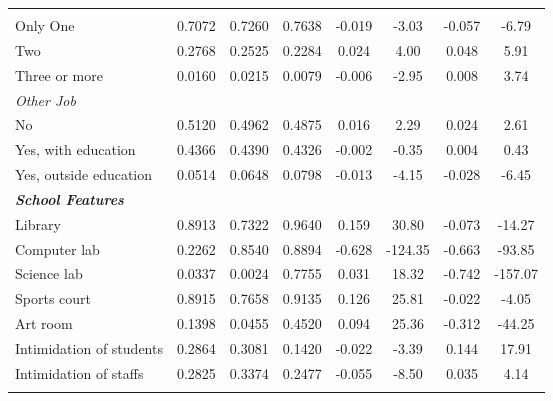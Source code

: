 \documentclass[a4paper, 12pt]{article}
\newcommand{\sym}[1]{\rlap{#1}}%
\begin{document}
\begin{longtable}{@{\extracolsep{1pt}}l*{7}{c}@{}}
\begin{adjustbox}{scale=0.9}
\begin{tabular}{l*{1}{ccccccc}}
\emph{Schools that work}&            &            &            &                     &            &                     &            \\
Only One    &      0.7072&      0.7260&      0.7638&      -0.019\sym{***}&       -3.03&      -0.057\sym{***}&       -6.79\\
Two         &      0.2768&      0.2525&      0.2284&       0.024\sym{***}&        4.00&       0.048\sym{***}&        5.91\\
Three or more&      0.0160&      0.0215&      0.0079&       -0.006\sym{***}&       -2.95&       0.008\sym{***}&        3.74\\
\emph{Other Job}&            &            &            &                     &            &                     &            \\
No          &      0.5120&      0.4962&      0.4875&       0.016\sym{**} &        2.29&       0.024\sym{***}&        2.61\\
Yes, with education&      0.4366&      0.4390&      0.4326&       -0.002         &       -0.35&       0.004         &        0.43\\
Yes, outside education&      0.0514&      0.0648&      0.0798&      -0.013\sym{***}&       -4.15&      -0.028\sym{***}&       -6.45\\
\textbf{\emph{School Features}}&            &            &            &                     &            &                     &            \\
Library     &      0.8913&      0.7322&      0.9640&      0.159\sym{***}&       30.80&      -0.073\sym{***}&      -14.27\\
Computer lab&      0.2262&      0.8540&      0.8894&      -0.628\sym{***}&     -124.35&      -0.663\sym{***}&      -93.85\\
Science lab &      0.0337&      0.0024&      0.7755&      0.031\sym{***}&       18.32&      -0.742\sym{***}&     -157.07\\
Sports court&      0.8915&      0.7658&      0.9135&      0.126\sym{***}&       25.81&      -0.022\sym{***}&       -4.05\\
Art room    &      0.1398&      0.0455&      0.4520&      0.094\sym{***}&       25.36&      -0.312\sym{***}&      -44.25\\
Intimidation of students&      0.2864&      0.3081&      0.1420&       -0.022\sym{***}&       -3.39&       0.144\sym{***}&       17.91\\
Intimidation of staffs&      0.2825&      0.3374&      0.2477&       -0.055\sym{***}&       -8.50&       0.035\sym{***}&        4.14\\

\end{tabular}
\end{adjustbox}
\end{longtable}
\end{document}
